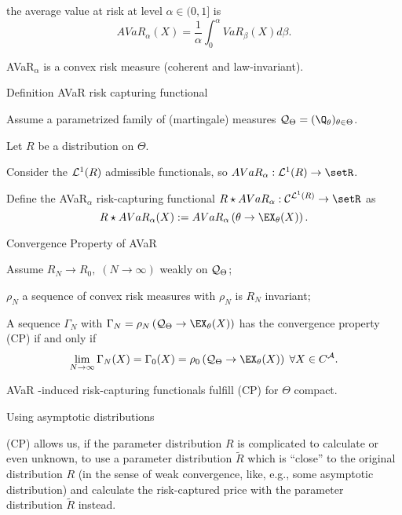 	the average value at risk at level $\alpha \in (0,1]$ is
$$
AVaR_\alpha(X) = \frac{1}{\alpha} \int_0^\alpha VaR_\beta(X) d\beta.
$$


	AVaR$_\alpha$ is a convex risk measure (coherent and law-invariant).





{Definition AVaR risk capturing functional}






	Assume a  parametrized family of (martingale) measures ${\cal Q}_\Theta = (\Q_\theta)_{\theta \in \Theta}$.


	Let $R$ be a distribution on $\Theta$.


	Consider the ${\cal L}^1(R)$ admissible functionals, so $AVaR_\alpha:  {\cal L}^1(R) \rightarrow \setR$.


	Define the AVaR$_\alpha$ risk-capturing functional
$
R \star AVaR_\alpha: {\cal C}^{{\cal L}^1(R)}\rightarrow \setR
$
as
$$
R \star AVaR_\alpha(X) := AVaR_\alpha\left(\theta \rightarrow \EX_\theta(X) \right).
$$





{Convergence Property of AVaR}






	Assume $R_N \rightarrow R_0, \; (N\rightarrow \infty) $ weakly on ${\cal Q}_\Theta$;


	$\rho_N$ a sequence of convex risk measures with $\rho_N$ is $R_N$ invariant;


	A sequence $\Gamma_N$ with $\Gamma_N= \rho_N\left({\cal Q}_\Theta \rightarrow \EX_\theta(X) \right)$ has the convergence property (CP) if and only if
$$
\lim_{N \rightarrow \infty} \Gamma_N(X) = \Gamma_0(X) = \rho_0 \left({\cal Q}_\Theta \rightarrow \EX_\theta(X) \right) \; \forall X \in C^{\cal A}.
$$


	AVaR -induced risk-capturing functionals fulfill (CP) for $\Theta$ compact.





{Using asymptotic distributions}






	(CP) allows us, if the parameter distribution $R$ is complicated to calculate or even unknown, to use a parameter distribution $\tilde{R}$ which is ``close'' to the original distribution $R$ (in the sense of weak convergence, like, e.g., some asymptotic distribution) and calculate the risk-captured price with the parameter distribution $\tilde{R}$ instead.


